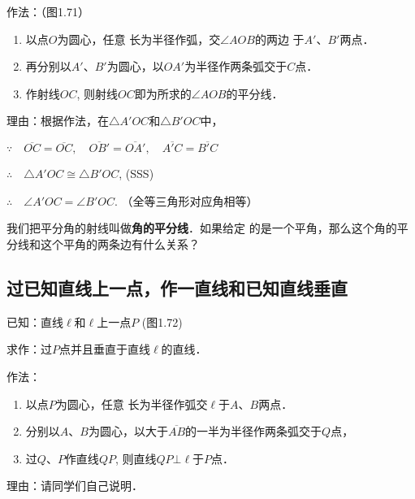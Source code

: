 作法：（图1.71）
\begin{enumerate}
\item 以点$O$为圆心，任意
长为半径作弧，交$\angle AOB$的两边
于$A'$、$B'$两点．
\item 再分别以$A'$、$B'$为圆心，以$OA'$为半径作两条弧交于$C$点．
\item 作射线$OC$, 
则射线$OC$即为所求的$\angle AOB$的平分线．
\end{enumerate}

理由：根据作法，在$\triangle A'OC$和$\triangle B'OC$中，

$\because\quad \overline{OC}=\overline{OC},\quad \overline{OB'}=\overline{OA'},\quad \overline{A'C}=\overline{B'C}$

$\therefore\quad \triangle A'OC\cong \triangle B'OC$, (SSS)

$\therefore\quad \angle A'OC=\angle B'OC$. （全等三角形对应角相等）

\begin{rmk}
	我们把平分角的射线叫做\textbf{角的平分线}．如果给定
的是一个平角，那么这个角的平分线和这个平角的两条边有什么关系？
\end{rmk}

\subsection{过已知直线上一点，作一直线和已知直线垂直}

已知：直线$\ell$和$\ell$上一点$P$ (图1.72)

求作：过$P$点并且垂直于直线$\ell$的直线．

作法：
\begin{enumerate}
	\item 以点$P$为圆心，任意
长为半径作弧交$\ell$于$A$、$B$两点．
\item  分别以$A$、$B$为圆心，以大于$\overline{AB}$的一半为半径作两条弧交于$Q$点，
\item  过$Q$、$P$作直线$QP$, 则直线$QP\bot\ell$于$P$点．
\end{enumerate}

理由：请同学们自己说明．

